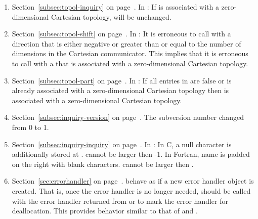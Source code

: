 \begin{enumerate}
\item
Section~\ref{subsec:topol-inquiry} on page~\pageref{subsec:topol-inquiry}.
\newline
In :
If  is associated with a zero-dimensional Cartesian topology,
 will be unchanged. 

\item
Section~\ref{subsec:topol-shift} on page~\pageref{subsec:topol-shift}.
\newline
In :
It is erroneous to call  with a direction that is either
negative or greater than or equal to the number of dimensions in the Cartesian
communicator. This implies that it is erroneous to call  with a
 that is associated with a zero-dimensional Cartesian topology.

\item
Section~\ref{subsec:topol-part} on page~\pageref{subsec:topol-part}.
\newline
In : 
If all entries in  are false or  is already associated
with a zero-dimensional Cartesian topology then  is associated
with a zero-dimensional Cartesian topology. 

\item[18.1.] 
Section~\ref{subsec:inquiry-version} on page~\pageref{subsec:inquiry-version}.
\newline
The subversion number changed from 0 to 1.
 
 
\item
Section~\ref{subsec:inquiry-inquiry} on page~\pageref{subsec:inquiry-inquiry}.
\newline
In : 
In C, a null character is additionally stored at . 
 cannot be larger then -1. 
In Fortran, name is padded on the right with blank characters. 
 cannot be larger then . 

\item
Section~\ref{sec:errorhandler} on page~\pageref{sec:errorhandler}.
\newline
{}%
%
%
 behave as if a
new error handler object is created.
That is, once the error handler is no longer needed,
 should be called with the error handler returned
from  or
to mark the error handler for deallocation.
This provides behavior similar to that of  and
.


\end{enumerate}
